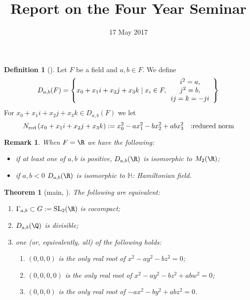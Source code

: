 \documentclass[a4paper,12pt]{article}
\title{Report on the Four Year Seminar}
\date{17 May 2017}
\newtheorem{theorem}{Theorem}
\newtheorem{remark}{Remark}
\theoremstyle{definition}
\newtheorem{definition}{Definition}
\begin{document}
\maketitle
\begin{definition}[{\cite[2.2]{bergeron2016spectrum}}]
	Let $F$ be a field and $a,b\in F$. We define\begin{equation*}
		D_{a,b}(F)=\left\{ x_0+x_1i+x_2j+x_3k\mid x_i\in F,\begin{array}[]{c}
		i^2=a,\\ j^2=b,\\ ij=k=-ji
	\end{array}\right\}
	\end{equation*}
	For $x_0+x_1i+x_2j+x_3k\in D_{a,b}(F)$ we let\begin{equation*}
		N_{\mbox{\scriptsize red}}\left(  x_0+x_1i+x_2j+x_3k\right):=x_0^2-ax_1^2-bx_2^2+abx_3^2\quad\mbox{:reduced norm}
	\end{equation*}
\end{definition}
\begin{remark}
	When $F=\R$ we have the following:\begin{itemize}
		\item if at least one of $a,b$ is positive, $D_{a,b}(\R)$ is isomorphic to $M_2(\R)$;
		\item if $a,b<0$ $D_{a,b}(\R)$ is isomorphic to $\mathbb{H}$: Hamiltonian field.
	\end{itemize}
\end{remark}
\begin{theorem}[main, {\cite[Thm. 2.3, 3.]{bergeron2016spectrum}}]
	The following are equivalent:
	\begin{enumerate}
		\item $\Gamma_{a,b}\subset G:=\mbox{\normalfont SL}_2(\R)$ is cocompact;
		\item $D_{a,b}(\Q)$ is divisible;
		\item one (or, equivalently, all) of the following holds:\begin{enumerate}
				\item $(0,0,0)$ is the only real root of $x^2-ay^2-bz^2=0$;
				\item $(0,0,0,0)$ is the only real root of $x^2-ay^2-bz^2+abw^2=0$;
				\item $(0,0,0)$ is the only real root of $-ax^2-by^2+abz^2=0$.
			\end{enumerate}
	\end{enumerate}
\end{theorem}


\end{document}
